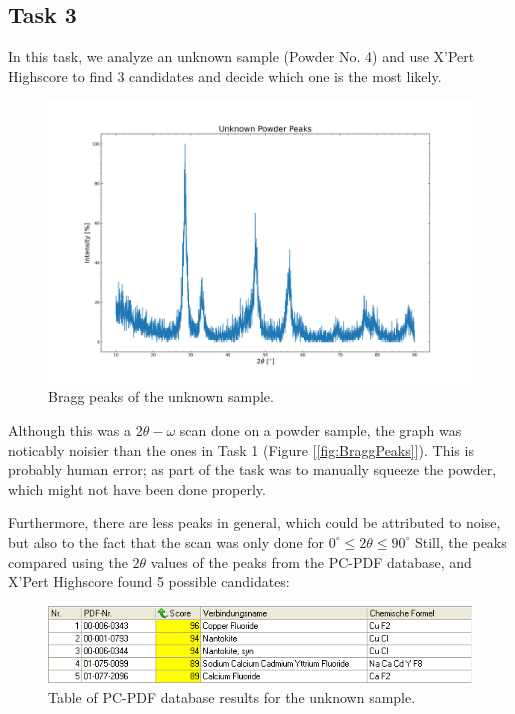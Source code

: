 \documentclass{article}
\begin{document}
\pagebreak{}

\subsection{Task 3}


In this task, we analyze an unknown sample (Powder No. 4) and use X'Pert Highscore to find 3 candidates and decide which one is the most likely. 

\begin{figure}[h]
	\centering
	\includegraphics[width=\textwidth]{Figures/UnknownPowderPeaks.png}
	\caption{Bragg peaks of the unknown sample.}
	\label{fig:UnknownPeaks}
\end{figure}

Although this was a $2\theta - \omega$ scan done on a powder sample, the graph was noticably noisier than the ones in Task 1 (Figure [\ref{fig:BraggPeaks}]). This is probably human error; as part of the task was to manually squeeze the powder, which might not have been done properly.


	Furthermore, there are less peaks in general, which could be attributed to noise, but also to the fact that the scan was only done for $0^{\circ} \leq 2\theta \leq 90^{\circ}$
Still, the peaks compared using the $ 2 \theta $ values of the peaks from the PC-PDF database, and X'Pert Highscore found 5 possible candidates:

\begin{figure}[h]
	\centering
	\includegraphics[width=\textwidth]{Figures/UnknownPowder.PNG}
	\caption{Table of PC-PDF database results for the unknown sample.}
	\label{fig:UnknownPowder}
\end{figure}
\end{document}

